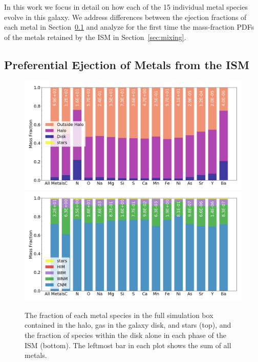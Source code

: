 \documentclass[twocolumn]{aastex61}
\begin{document}
In this work we focus in detail on how each of the 15 individual metal species evolve in this galaxy. We address differences between the ejection fractions of each metal in Section~\ref{sec:ejection} and analyze for the first time the mass-fraction PDFs of the metals retained by the ISM in Section~\ref{sec:mixing}.

\subsection{Preferential Ejection of Metals from the ISM}
\label{sec:ejection}

\begin{figure}
\centering
\includegraphics[width=0.99\linewidth]{species_bar.png}\\
\includegraphics[width=0.99\linewidth]{species_bar_ISM.png}
\caption{The fraction of each metal species in the full simulation box contained in the halo, gas in the galaxy disk, and stars (top), and the fraction of species within the disk alone in each phase of the ISM (bottom). The leftmost bar in each plot shows the sum of all metals.}
\label{fig:species_fractions}
\end{figure}
\end{document}
